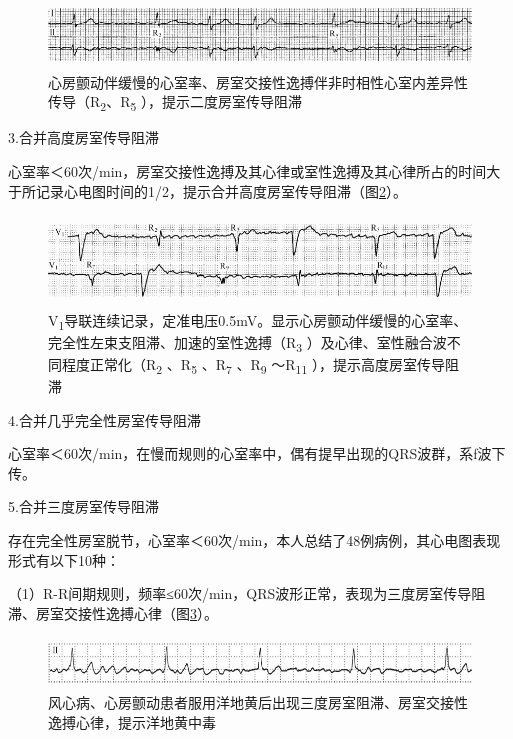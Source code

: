 \begin{figure}[!htbp]
 \centering
 \includegraphics[width=5.58333in,height=0.69792in]{./images/Image00223.jpg}
 \captionsetup{justification=centering}
 \caption{心房颤动伴缓慢的心室率、房室交接性逸搏伴非时相性心室内差异性传导（R\textsubscript{2}、R\textsubscript{5} ），提示二度房室传导阻滞}
 \label{fig13-15}
  \end{figure} 


3.合并高度房室传导阻滞

心室率＜60次/min，房室交接性逸搏及其心律或室性逸搏及其心律所占的时间大于所记录心电图时间的1/2，提示合并高度房室传导阻滞（图\ref{fig13-16}）。

\begin{figure}[!htbp]
 \centering
 \includegraphics[width=5.58333in,height=0.94792in]{./images/Image00224.jpg}
 \captionsetup{justification=centering}
 \caption{V\textsubscript{1}导联连续记录，定准电压0.5mV。显示心房颤动伴缓慢的心室率、完全性左束支阻滞、加速的室性逸搏（R\textsubscript{3} ）及心律、室性融合波不同程度正常化（R\textsubscript{2} 、R\textsubscript{5} 、R\textsubscript{7} 、R\textsubscript{9} ～R\textsubscript{11} ），提示高度房室传导阻滞}
 \label{fig13-16}
  \end{figure} 


4.合并几乎完全性房室传导阻滞

心室率＜60次/min，在慢而规则的心室率中，偶有提早出现的QRS波群，系f波下传。

5.合并三度房室传导阻滞

存在完全性房室脱节，心室率＜60次/min，本人总结了48例病例，其心电图表现形式有以下10种：

（1）R-R间期规则，频率≤60次/min，QRS波形正常，表现为三度房室传导阻滞、房室交接性逸搏心律（图\ref{fig13-17}）。

\begin{figure}[!htbp]
 \centering
 \includegraphics[width=5.61458in,height=0.53125in]{./images/Image00225.jpg}
 \captionsetup{justification=centering}
 \caption{风心病、心房颤动患者服用洋地黄后出现三度房室阻滞、房室交接性逸搏心律，提示洋地黄中毒}
 \label{fig13-17}
  \end{figure} 

